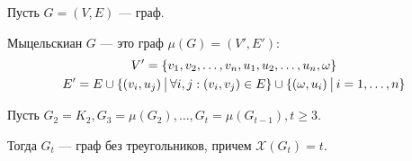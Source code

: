 \begin{defn}{}{}
    Пусть \( G = (V, E) \) --- граф.

    Мыцельскиан \( G \) --- это граф \( \mu(G) = (V', E') \):
    \begin{gather*}
        V' = \{ v_1, v_2, \ldots, v_n, u_1, u_2, \ldots, u_n, \omega \}
        \\
        E' = E \cup \{ (v_i, u_j) \ \vline \ \forall i, j : (v_i, v_j) \in E \} \cup \{ ( \omega, u_i ) \ \vline \ i = 1, \ldots, n \}
    \end{gather*}
\end{defn}

\begin{thrm}{}{}
    Пусть \( G_2 = K_2, G_3 = \mu(G_2), \ldots, G_t = \mu(G_{t - 1}), t \geq 3 \).

    Тогда \( G_t \) --- граф без треугольников, причем \( \mathcal{X}(G_t) = t \).
\end{thrm}

